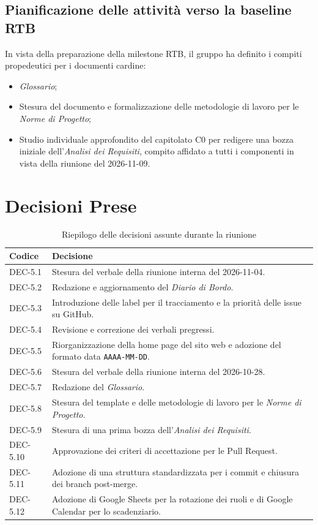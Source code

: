 \documentclass[11pt, a4paper]{article}
\begin{document}
\subsection{Pianificazione delle attività verso la baseline RTB}
In vista della preparazione della milestone RTB, il gruppo ha definito i compiti propedeutici per i documenti cardine:
\begin{itemize}
    \item \textit{Glossario};
    \item Stesura del documento e formalizzazione delle metodologie di lavoro per le \textit{Norme di Progetto};
    \item Studio individuale approfondito del capitolato C0 per redigere una bozza iniziale dell'\textit{Analisi dei Requisiti}, compito affidato a tutti i componenti in vista della riunione del 2026-11-09.
\end{itemize}


\clearpage
\section{Decisioni Prese}

\begin{table}[htbp]
\centering
\caption{Riepilogo delle decisioni assunte durante la riunione}
\label{tab:decisioni}
\begin{tabularx}{\textwidth}{l X}
\toprule
\textbf{Codice} & \textbf{Decisione} \\
\midrule
DEC-5.1 & Stesura del verbale della riunione interna del 2026-11-04. \\
DEC-5.2 & Redazione e aggiornamento del \textit{Diario di Bordo}. \\
DEC-5.3 & Introduzione delle label per il tracciamento e la priorità delle issue su GitHub. \\
DEC-5.4 & Revisione e correzione dei verbali pregressi. \\
DEC-5.5 & Riorganizzazione della home page del sito web e adozione del formato data \texttt{AAAA-MM-DD}. \\
DEC-5.6 & Stesura del verbale della riunione interna del 2026-10-28. \\
DEC-5.7 & Redazione del \textit{Glossario}. \\
DEC-5.8 & Stesura del template e delle metodologie di lavoro per le \textit{Norme di Progetto}. \\
DEC-5.9 & Stesura di una prima bozza dell'\textit{Analisi dei Requisiti}. \\ 
DEC-5.10 & Approvazione dei criteri di accettazione per le Pull Request. \\
DEC-5.11 & Adozione di una struttura standardizzata per i commit e chiusura dei branch post-merge. \\
DEC-5.12 & Adozione di Google Sheets per la rotazione dei ruoli e di Google Calendar per lo scadenziario. \\
\bottomrule
\end{tabularx}
\end{table}
\end{document}
